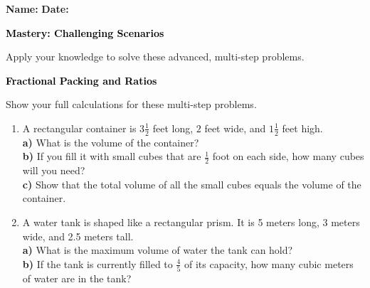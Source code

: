 \documentclass[12pt, letterpaper, fleqn]{article}
\newcommand{\blanklong}{\underline{\hspace{6.5cm}}}
\begin{document}
\textbf{Name:} \underline{\hspace{5cm}}
\hfill
\textbf{Date:} \underline{\hspace{3cm}}\\

\begin{tcolorbox}[colback=customteal!20]
    \large\textcolor{black}{\textbf{Mastery: Challenging Scenarios}}
\end{tcolorbox}

\vspace{3mm}
\noindent
Apply your knowledge to solve these advanced, multi-step problems.

\vspace{4mm}

\begin{tcolorbox}[colback=customteal!20]
\large\textcolor{black}{\textbf{Fractional Packing and Ratios}}
\end{tcolorbox}

\noindent
Show your full calculations for these multi-step problems.

\vspace{3mm}
\begin{enumerate}[itemsep=1.5cm, leftmargin=0.6cm]
\item A rectangular container is $3\frac{1}{2}$ feet long, $2$ feet wide, and $1\frac{1}{2}$ feet high. \\
\textbf{a)} What is the volume of the container? \blanklong \\
\textbf{b)} If you fill it with small cubes that are $\frac{1}{2}$ foot on each side, how many cubes will you need? \blanklong \\
\textbf{c)} Show that the total volume of all the small cubes equals the volume of the container. \blanklong
\vspace{1.5cm}
\item A water tank is shaped like a rectangular prism. It is 5 meters long, 3 meters wide, and 2.5 meters tall. \\
\textbf{a)} What is the maximum volume of water the tank can hold? \blanklong \\
\textbf{b)} If the tank is currently filled to $\frac{4}{5}$ of its capacity, how many cubic meters of water are in the tank? \blanklong
\vspace{1.5cm}
\end{enumerate}
\newpage
\end{document}
